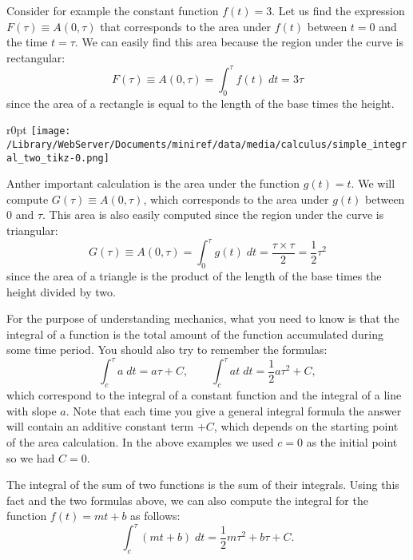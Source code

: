 \documentclass[letterpaper,9pt,journal]{IEEEtran}
\newcommand{\be}{\begin{equation}}
\newcommand{\ee}{\end{equation}}
\begin{document}
Consider for example the constant function $f(t)=3$.
Let us find the expression $F(\tau)\equiv A(0,\tau)$
that corresponds to the area under $f(t)$ between 
$t=0$ and the time $t=\tau$.
We can easily find this area because the region under the curve is rectangular:
\[ 
 \! F(\tau) \equiv A(0,\tau) =  \! \int_0^\tau \!\! f(t)\;dt  = 3 \tau
\]
since the area of a rectangle is equal to the length of the base times the height.


\begin{wrapfigure}{r}{0pt}
\texttt{[image: /Library/WebServer/Documents/miniref/data/media/calculus/simple\_integral\_two\_tikz-0.png]}
\end{wrapfigure}

Anther important calculation is the area under 
the function $g(t)=t$. We will compute $G(\tau)\equiv A(0,\tau)$,
which corresponds to the area under $g(t)$ between $0$ and $\tau$.
This area is also easily computed since the region under the curve 
is triangular:
\[
 \!\!G(\tau) \!\equiv \!A(0,\tau) \!=\! \int_0^\tau \!\! g(t) \; dt \!= \!\frac{\tau\times\tau}{2} \!= \!\frac{1}{2}\tau^2
\]
since the area of a triangle is the product of the length of
the base times the height divided by two.


%

For the purpose of understanding mechanics,
what you need to know is that the integral of a function is the total amount of the function accumulated during some time period. 
You should also try to remember the formulas:
\[
 \int_c^\tau a \;dt = a\tau + C, \qquad 
 \int_c^\tau at \;dt = \frac{1}{2}a\tau^2 + C,
\]
which correspond to the integral of a constant function
and the integral of a line with slope $a$.
Note that each time you give a general integral formula
the answer will contain an additive constant term $+C$,
which depends on the starting point of the area calculation. 
In the above examples we used $c=0$ as the initial
point so we had $C=0$.

The integral of the sum of two functions is the sum of their integrals.
Using this fact and the two formulas above, 
we can also compute the integral for the function $f(t)=mt+b$ as follows:
\be
  \int_c^\tau (mt + b)\;dt 
 = \frac{1}{2}m\tau^2 + b \tau  + C.
  \label{integral-formula}
\ee
\end{document}
